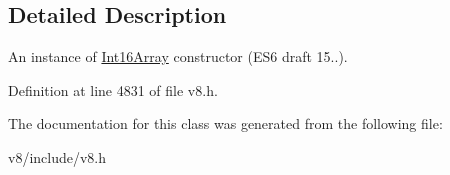 \subsection{Detailed Description}
An instance of \mbox{\hyperlink{classv8_1_1Int16Array}{Int16\+Array}} constructor (E\+S6 draft 15..). 

Definition at line 4831 of file v8.\+h.



The documentation for this class was generated from the following file\+:\begin{DoxyCompactItemize}
\item 
v8/include/v8.\+h\end{DoxyCompactItemize}
